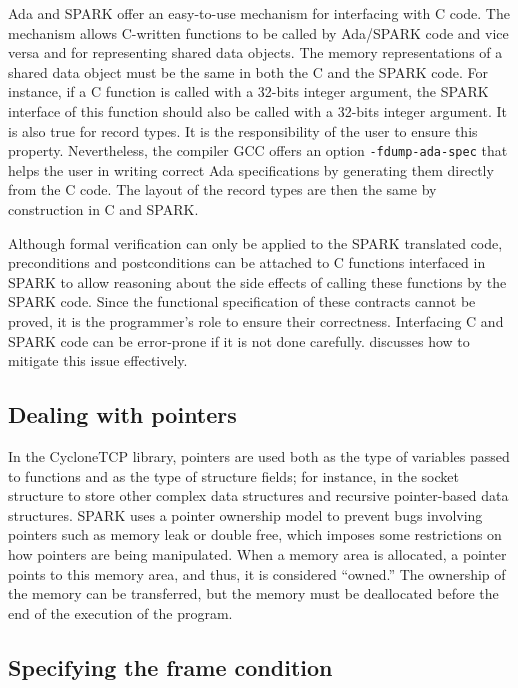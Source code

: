 \documentclass[conference]{IEEEtran}
\begin{document}
Ada and SPARK offer an easy-to-use mechanism for interfacing with C code. The mechanism allows C-written functions to be called by Ada/SPARK code and vice versa and for representing shared data objects. The memory representations of a shared data object must be the same in both the C and the SPARK code. For instance, if a C function is called with a 32-bits integer argument, the SPARK interface of this function should also be called with a 32-bits integer argument. It is also true for record types. It is the responsibility of the user to ensure this property. Nevertheless, the compiler GCC offers an option \texttt{-fdump-ada-spec} that helps the user in writing correct Ada specifications by generating them directly from the C code. The layout of the record types are then the same by construction in C and SPARK.

Although formal verification can only be applied to the SPARK translated code,  preconditions and postconditions can be attached to C functions interfaced in SPARK to allow reasoning about the side effects of calling these functions by the SPARK code. Since the functional specification of these contracts cannot be proved, it is the programmer's role to ensure their correctness. Interfacing C and SPARK code can be error-prone if it is not done carefully.  discusses how to mitigate this issue effectively.


\subsection{Dealing with pointers}
\label{sec:pointers}

In the CycloneTCP library, pointers are used both as the type of variables passed to functions and as the type of structure fields; for instance, in the socket structure to store other complex data structures and recursive pointer-based data structures. SPARK uses a pointer ownership model to prevent bugs involving pointers such as memory leak or double free, which imposes some restrictions on how pointers are being manipulated. When a memory area is allocated, a pointer points to this memory area, and thus, it is considered ``owned.'' The ownership of the memory can be transferred, but the memory must be deallocated before the end of the execution of the program.

\subsection{Specifying the frame condition}
\end{document}
